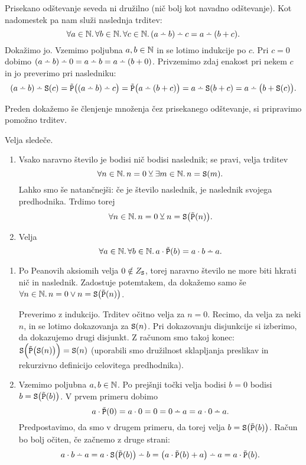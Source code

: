 Prisekano odštevanje seveda ni družilno (nič bolj kot navadno odštevanje). Kot nadomestek pa nam služi naslednja trditev:
\[\all{a \in \NN}\all{b \in \NN}\all{c \in \NN}{(a \monus b) \monus c = a \monus (b + c)}.\]
Dokažimo jo. Vzemimo poljubna $a, b \in \mathbb{N}$ in se lotimo indukcije po $c$. Pri $c = 0$ dobimo $(a \monus b) \monus 0 = a \monus b = a \monus (b + 0)$. Privzemimo zdaj enakost pri nekem $c$ in jo preverimo pri nasledniku:
\[(a \monus b) \monus \suc(c) = \tprd\big((a \monus b) \monus c\big) = \tprd\big(a \monus (b + c)\big) = a \monus \suc(b + c) = a \monus \big(b + \suc(c)\big).\]

Preden dokažemo še členjenje množenja čez prisekanego odštevanje, si pripravimo pomožno trditev.

\begin{lema}\label{lema:nic-ali-naslednik}
Velja sledeče.
\begin{enumerate}
\item
Vsako naravno število je bodisi nič bodisi naslednik; se pravi, velja trditev
\[\forall n \in \mathbb{N} .\,{n = 0 \mathbin{\veebar} \exists m \in \mathbb{N} .\,{n = \mathtt{S}(m)}}.\]
Lahko smo še natančnejši: če je število naslednik, je naslednik svojega predhodnika. Trdimo torej
\[\forall n \in \mathbb{N} .\,{n = 0 \mathbin{\veebar} n = \mathtt{S}\big(\tilde{\mathtt{P}}(n)\big)}.\]
\item
Velja
\[\all{a \in \NN}\all{b \in \NN}{a \cdot \tprd(b) = a \cdot b \monus a}.\]
\end{enumerate}
\end{lema}

\begin{dokaz}
\begin{enumerate}
\item
Po Peanovih aksiomih velja $0 \notin Z_{\mathtt{S}}$, torej naravno število ne more biti hkrati nič in naslednik. Zadostuje potemtakem, da dokažemo samo še $\forall n \in \mathbb{N} .\,{n = 0 \lor n = \mathtt{S}\big(\tilde{\mathtt{P}}(n)\big)}$.

Preverimo z indukcijo. Trditev očitno velja za $n = 0$. Recimo, da velja za neki $n$, in se lotimo dokazovanja za $\mathtt{S}(n)$. Pri dokazovanju disjunkcije si izberimo, da dokazujemo drugi disjunkt. Z računom smo takoj konec: $\mathtt{S}\Big(\tilde{\mathtt{P}}\big(\mathtt{S}(n)\big)\Big) = \mathtt{S}(n)$ (uporabili smo družilnost sklapljanja preslikav in rekurzivno definicijo celovitega predhodnika).
\item
Vzemimo poljubna $a, b \in \mathbb{N}$. Po prejšnji točki velja bodisi $b = 0$ bodisi $b = \mathtt{S}\big(\tilde{\mathtt{P}}(b)\big)$. V prvem primeru dobimo
\[a \cdot \tprd(0) = a \cdot 0 = 0 = 0 \monus a = a \cdot 0 \monus a.\]
Predpostavimo, da smo v drugem primeru, da torej velja $b = \mathtt{S}\big(\tilde{\mathtt{P}}(b)\big)$. Račun bo bolj očiten, če začnemo z druge strani:
\[a \cdot b \monus a = a \cdot \suc\big(\tprd(b)\big) \monus b = \big(a \cdot \tprd(b) + a\big) \monus a = a \cdot \tprd(b).\]
\end{enumerate}
\end{dokaz}

